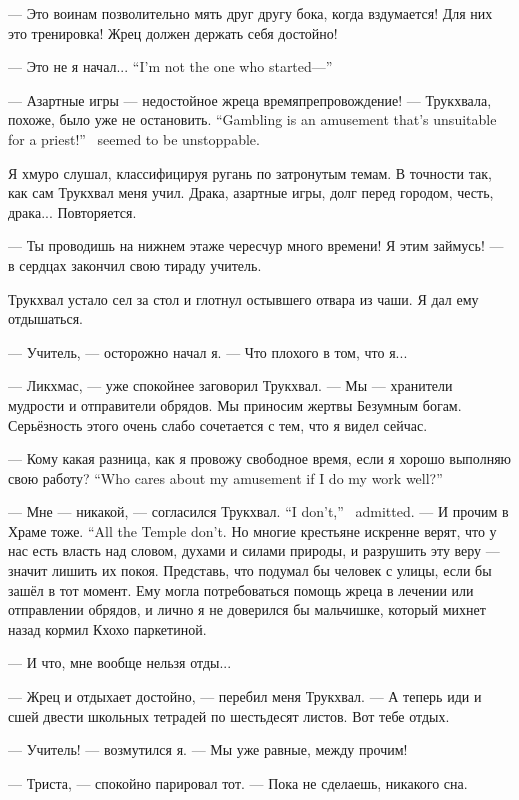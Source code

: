 --- Это воинам позволительно мять друг другу бока, когда вздумается!
Для них это тренировка!
Жрец должен держать себя достойно!

{--- Это не я начал...}
{``I'm not the one who started---''}

{--- Азартные игры --- недостойное жреца времяпрепровождение! --- Трукхвала, похоже, было уже не остановить.}
{``Gambling is an amusement that's unsuitable for a priest!'' \Trukchual\ seemed to be unstoppable.}

Я хмуро слушал, классифицируя ругань по затронутым темам.
В точности так, как сам Трукхвал меня учил.
Драка, азартные игры, долг перед городом, честь, драка...
Повторяется.

--- Ты проводишь на нижнем этаже чересчур много времени!
Я этим займусь! --- в сердцах закончил свою тираду учитель.

Трукхвал устало сел за стол и глотнул остывшего отвара из чаши.
Я дал ему отдышаться.

--- Учитель, --- осторожно начал я.
--- Что плохого в том, что я...

--- Ликхмас, --- уже спокойнее заговорил Трукхвал.
--- Мы --- хранители мудрости и отправители обрядов.
Мы приносим жертвы Безумным богам.
Серьёзность этого очень слабо сочетается с тем, что я видел сейчас.

{--- Кому какая разница, как я провожу свободное время, если я хорошо выполняю свою работу?}
{``Who cares about my amusement if I do my work well?''}

{--- Мне --- никакой, --- согласился Трукхвал.}
{``I don't,'' \Trukchual\ admitted.}
{--- И прочим в Храме тоже.}
{``All the Temple don't.}
Но многие крестьяне искренне верят, что у нас есть власть над словом, духами и силами природы, и разрушить эту веру --- значит лишить их покоя.
Представь, что подумал бы человек с улицы, если бы зашёл в тот момент.
Ему могла потребоваться помощь жреца в лечении или отправлении обрядов, и лично я не доверился бы мальчишке, который михнет назад кормил Кхохо паркетиной.

--- И что, мне вообще нельзя отды...

--- Жрец и отдыхает достойно, --- перебил меня Трукхвал.
--- А теперь иди и сшей двести школьных тетрадей по шестьдесят листов.
Вот тебе отдых.

--- Учитель! --- возмутился я.
--- Мы уже равные, между прочим!

--- Триста, --- спокойно парировал тот.
--- Пока не сделаешь, никакого сна.

